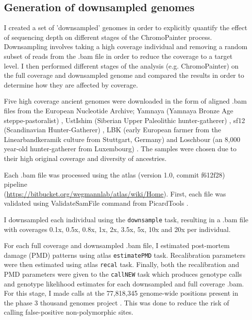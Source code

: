 \subsection{Generation of downsampled genomes}
I created a set of 'downsampled' genomes in order to explicitly quantify the effect of sequencing depth on different stages of the ChromoPainter process. Downsampling involves taking a high coverage individual and removing a random subset of reads from the .bam file in order to reduce the coverage to a target level. I then performed different stages of the analysis (e.g. ChromoPainter) on the full coverage and downsampled genome and compared the results in order to determine how they are affected by coverage.

Five high coverage ancient genomes were downloaded in the form of aligned .bam files from the European Nucleotide Archive; Yamnaya (Yamnaya Bronze Age steppe-pastoralist) \cite{deBarrosDamgaardeaar7711}, UstIshim (Siberian Upper Paleolithic hunter-gatherer) \cite{Fu2014}, sf12 (Scandinavian Hunter-Gatherer) \cite{Gunther2018a}, LBK (early European farmer from the Linearbandkeramik culture from Stuttgart, Germany) \cite{Lazaridis2014} and Loschbour (an 8,000 year-old hunter-gatherer from Luxembourg) \cite{Lazaridis2014}. The samples were chosen due to their high original coverage and diversity of ancestries. 

Each .bam file was processed using the atlas (version 1.0, commit f612f28) pipeline \cite{Link2017} \\(\url{https://bitbucket.org/wegmannlab/atlas/wiki/Home}). First, each file was validated using ValidateSamFile command from PicardTools \cite{Picard2018toolkit}. 

I downsampled each individual using the \texttt{downsample} task, resulting in a .bam file with coverages 0.1x, 0.5x, 0.8x, 1x, 2x, 3.5x, 5x, 10x and 20x per individual. 

For each full coverage and downsampled .bam file, I estimated post-mortem damage (PMD) patterns using atlas \texttt{estimatePMD} task. Recalibration parameters were then estimated using atlas \texttt{recal} task. Finally, both the recalibration and PMD parameters were given to the \texttt{callNEW} task which produces genotype calls and genotype likelihood estimates for each downsampled and full coverage .bam. For this stage, I made calls at the 77,818,345 genome-wide positions present in the phase 3 thousand genomes project \cite{1000GenomesProjectConsortium2015}. This was done to reduce the risk of calling false-positive non-polymorphic sites.

